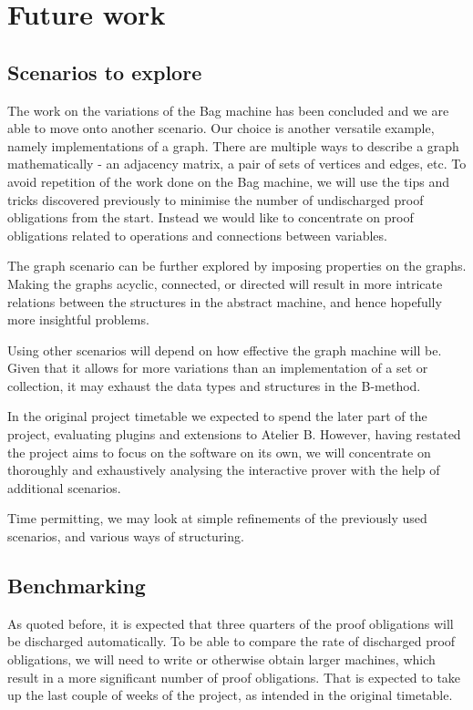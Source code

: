 \documentclass[11pt,journal]{IEEEtran}
\begin{document}
	
	\section{Future work}
	\subsection{Scenarios to explore}
	The work on the variations of the Bag machine has been concluded and we are able to move onto another scenario. Our choice is another versatile example, namely implementations of a graph. There are multiple ways to describe a graph mathematically - an adjacency matrix, a pair of sets of vertices and edges, etc. To avoid repetition of the work done on the Bag machine, we will use the tips and tricks discovered previously to minimise the number of undischarged proof obligations from the start. Instead we would like to concentrate on proof obligations related to operations and connections between variables.
	
	The graph scenario can be further explored by imposing properties on the graphs. Making the graphs acyclic, connected, or directed will result in more intricate relations between the structures in the abstract machine, and hence hopefully more insightful problems.
	
	Using other scenarios will depend on how effective the graph machine will be. Given that it allows for more variations than an implementation of a set or collection, it may exhaust the data types and structures in the B-method.
	
	In the original project timetable we expected to spend the later part of the project, evaluating plugins and extensions to Atelier B. However, having restated the project aims to focus on the software on its own, we will concentrate on thoroughly and exhaustively analysing the interactive prover with the help of additional scenarios.
	
	Time permitting, we may look at simple refinements of the previously used scenarios, and various ways of structuring.
	
	\subsection{Benchmarking}
	
	As quoted before, it is expected that three quarters of the proof obligations will be discharged automatically\cite{Prover guide}. To be able to compare the rate of discharged proof obligations, we will need to write or otherwise obtain larger machines, which result in a more significant number of proof obligations. That is expected  to take up the last couple of weeks of the project, as intended in the original timetable.
\end{document}
